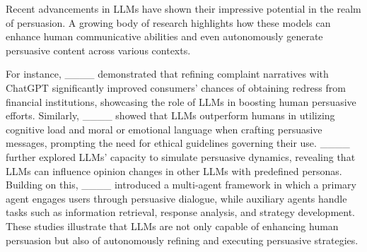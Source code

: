 


Recent advancements in LLMs have shown their impressive potential in the realm of persuasion. 
A growing body of research highlights how these models can enhance human communicative abilities and even autonomously generate persuasive content across various contexts.

For instance, ____ demonstrated that refining complaint narratives with ChatGPT significantly improved consumers' chances of obtaining redress from financial institutions, showcasing the role of LLMs in boosting human persuasive efforts. 
Similarly, ____ showed that LLMs outperform humans in utilizing cognitive load and moral or emotional language when crafting persuasive messages, prompting the need for ethical guidelines governing their use. 
____ further explored LLMs' capacity to simulate persuasive dynamics, revealing that LLMs can influence opinion changes in other LLMs with predefined personas. 
Building on this, ____ introduced a multi-agent framework in which a primary agent engages users through persuasive dialogue, while auxiliary agents handle tasks such as information retrieval, response analysis, and strategy development.
These studies illustrate that LLMs are not only capable of enhancing human persuasion but also of autonomously refining and executing persuasive strategies.

